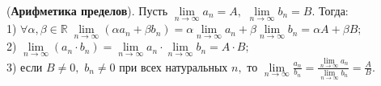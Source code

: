 \begin{theorem}(\textbf{Арифметика пределов}).
    Пусть $\lim\limits_{n\rightarrow\infty}a_n=A,$
    $\lim\limits_{n\rightarrow\infty}b_n=B.$ Тогда:\\
    1) $\forall\alpha, \beta\in\mathbb{R}\;\lim\limits_{n\rightarrow\infty}(\alpha a_n
        +\beta b_n)=\alpha\lim\limits_{n\rightarrow\infty}
        a_n+\beta\lim\limits_{n\rightarrow\infty}b_n=
        \alpha A+\beta B;$\\
    2) $\lim\limits_{n\rightarrow\infty}(a_n
        \cdot b_n)=\lim\limits_{n\rightarrow\infty}
        a_n\cdot \lim\limits_{n\rightarrow\infty}b_n=
        A\cdot B;$\\
    3) если $B\neq0,$ $b_n\neq0$ при всех
    натуральных $n,$ то
    $\lim\limits_{n\rightarrow\infty}\frac{a_n}{b_n}
        =\frac{\lim\limits_{n\rightarrow\infty}
            a_n}{\lim\limits_{n\rightarrow\infty}b_n}=
        \frac{A}{B}.$
\end{theorem}

